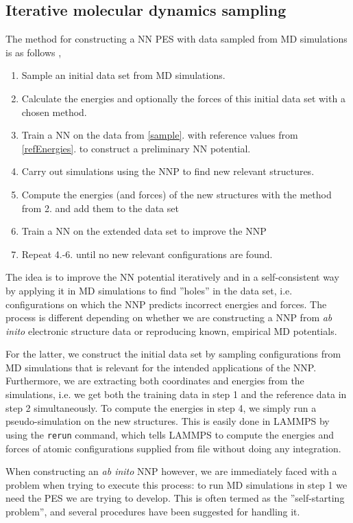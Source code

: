 \documentclass[twoside,english]{uiofysmaster}
\begin{document}
\subsection{Iterative molecular dynamics sampling} \label{sec:iterativeMDsampling}
The method for constructing a NN PES with data sampled from MD simulations is as follows \cite{Behler11general}
\cite{Raff12},
\begin{enumerate}
 \item Sample an initial data set from MD simulations. \label{sample} 
 \item Calculate the energies and optionally the forces of this initial data set with a chosen method. \label{refEnergies}
 \item Train a NN on the data from \ref{sample}. with reference values from \ref{refEnergies}. to
 construct a preliminary NN potential.
 \item Carry out simulations using the NNP to find new relevant structures. 
 \item Compute the energies (and forces) of the new structures with the method from 2. and add them to the data set
 \item Train a NN on the extended data set to improve the NNP
 \item Repeat 4.-6. until no new relevant configurations are found. 
  \label{NNPalgorithm}
\end{enumerate}
The idea is to improve the NN potential iteratively and in a self-consistent 
way by applying it in MD simulations to find 
''holes'' in the data set, i.e. configurations on which the NNP predicts incorrect energies and forces. The process
is different depending on whether we are constructing a NNP from \textit{ab inito} electronic structure data
or reproducing known, empirical MD potentials. 

For the latter, we construct the initial data set by sampling configurations from MD simulations that is relevant
for the intended applications of the NNP. Furthermore, we are extracting both coordinates and energies from the simulations, i.e.
we get both the training data in step 1 and the reference data in step 2 simultaneously. To compute the energies in
step 4, we simply run a pseudo-simulation on the new structures. This is easily done in LAMMPS by using 
the \texttt{rerun} command, which tells LAMMPS to compute the energies and forces of atomic configurations 
supplied from file without doing any integration. 

When constructing an \textit{ab inito} NNP however, we are immediately faced with a problem when trying to execute this process: 
to run MD simulations in step 1 we need the PES we are trying to develop. 
This is often termed as the ''self-starting problem'', 
and several procedures have been suggested for handling it. 
\end{document}
